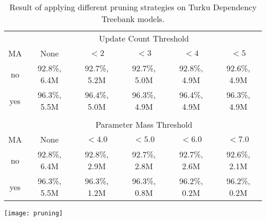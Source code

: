 \begin{table}[htb!]
\begin{center}
\begin{tabular}{c|ccccc}
\multicolumn{1}{c}{}                       & \multicolumn{5}{c}{Update Count Threshold}\\
MA                     & None            & $< 2$        & $< 3$        & $< 4$        & $< 5$       \\
\hline
no                     & 92.8\%, 6.4M    & 92.7\%, 5.2M & 92.7\%, 5.0M & 92.8\%, 4.9M & 92.6\%, 4.9M \\
yes                    & 96.3\%, 5.5M    & 96.4\%, 5.0M & 96.3\%, 4.9M & 96.4\%, 4.9M & 96.3\%, 4.9M \\
                       &                 &              &              &              &              \\
\multicolumn{1}{c}{}     & \multicolumn{5}{c}{Parameter Mass Threshold}\\
MA                     & None           & $< 4.0$        & $< 5.0$      & $< 6.0$      & $< 7.0$     \\
\hline
no                     & 92.8\%, 6.4M   & 92.8\%, 2.9M   & 92.7\%, 2.8M & 92.7\%, 2.6M & 92.6\%, 2.1M \\
yes                    & 96.3\%, 5.5M   & 96.3\%, 1.2M   & 96.3\%, 0.8M & 96.2\%, 0.2M & 96.2\%, 0.2M \\
\end{tabular}
\caption{Result of applying different pruning strategies on Turku Dependency Treebank models.}
\end{center}
\end{table}

\begin{table}[htb!]
\begin{center}
\texttt{[image: pruning]}
\end{center}
\end{table}



